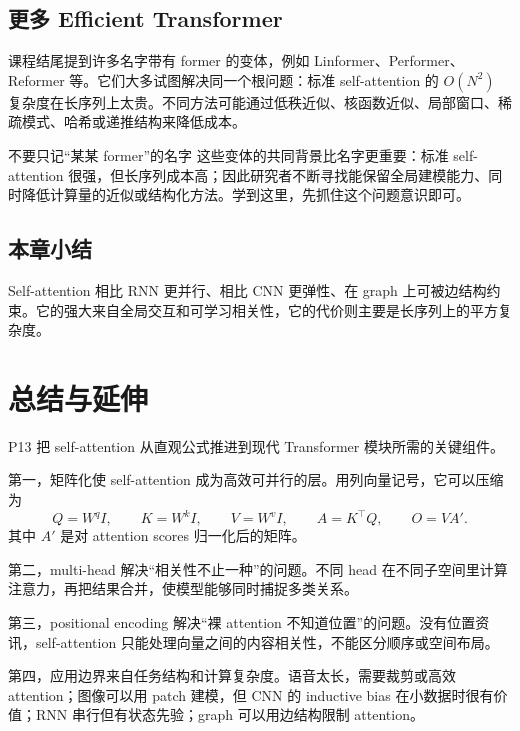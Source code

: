 \documentclass[a4paper]{article}
\begin{document}
\subsection{更多 Efficient Transformer}

课程结尾提到许多名字带有 former 的变体，例如 Linformer、Performer、Reformer 等。它们大多试图解决同一个根问题：标准 self-attention 的 $O(N^2)$ 复杂度在长序列上太贵。不同方法可能通过低秩近似、核函数近似、局部窗口、稀疏模式、哈希或递推结构来降低成本。

\begin{warningbox}{不要只记“某某 former”的名字}
    这些变体的共同背景比名字更重要：标准 self-attention 很强，但长序列成本高；因此研究者不断寻找能保留全局建模能力、同时降低计算量的近似或结构化方法。学到这里，先抓住这个问题意识即可。
\end{warningbox}

\subsection{本章小结}

Self-attention 相比 RNN 更并行、相比 CNN 更弹性、在 graph 上可被边结构约束。它的强大来自全局交互和可学习相关性，它的代价则主要是长序列上的平方复杂度。

\section{总结与延伸}

P13 把 self-attention 从直观公式推进到现代 Transformer 模块所需的关键组件。

第一，矩阵化使 self-attention 成为高效可并行的层。用列向量记号，它可以压缩为
\[
    Q=W^qI,\qquad K=W^kI,\qquad V=W^vI,\qquad
    A=K^\top Q,\qquad O=VA'.
\]
其中 $A'$ 是对 attention scores 归一化后的矩阵。

第二，multi-head 解决“相关性不止一种”的问题。不同 head 在不同子空间里计算注意力，再把结果合并，使模型能够同时捕捉多类关系。

第三，positional encoding 解决“裸 attention 不知道位置”的问题。没有位置资讯，self-attention 只能处理向量之间的内容相关性，不能区分顺序或空间布局。

第四，应用边界来自任务结构和计算复杂度。语音太长，需要裁剪或高效 attention；图像可以用 patch 建模，但 CNN 的 inductive bias 在小数据时很有价值；RNN 串行但有状态先验；graph 可以用边结构限制 attention。
\end{document}

